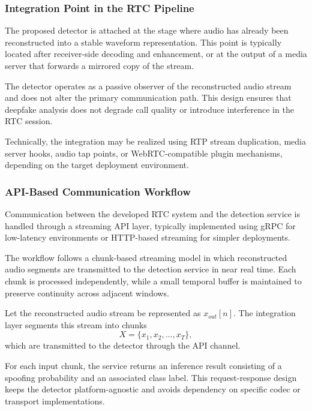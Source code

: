 \subsubsection{Integration Point in the RTC Pipeline}

The proposed detector is attached at the stage where audio has already been reconstructed into a stable waveform representation. This point is typically located after receiver-side decoding and enhancement, or at the output of a media server that forwards a mirrored copy of the stream.

The detector operates as a passive observer of the reconstructed audio stream and does not alter the primary communication path. This design ensures that deepfake analysis does not degrade call quality or introduce interference in the RTC session.

Technically, the integration may be realized using RTP stream duplication, media server hooks, audio tap points, or WebRTC-compatible plugin mechanisms, depending on the target deployment environment.

\subsubsection{API-Based Communication Workflow}

Communication between the developed RTC system and the detection service is handled through a streaming API layer, typically implemented using gRPC for low-latency environments or HTTP-based streaming for simpler deployments.

The workflow follows a chunk-based streaming model in which reconstructed audio segments are transmitted to the detection service in near real time. Each chunk is processed independently, while a small temporal buffer is maintained to preserve continuity across adjacent windows.

Let the reconstructed audio stream be represented as \(x_{out}[n]\). The integration layer segments this stream into chunks
\begin{equation}
X = \{x_1, x_2, \ldots, x_T\},
\end{equation}
which are transmitted to the detector through the API channel.

For each input chunk, the service returns an inference result consisting of a spoofing probability and an associated class label. This request-response design keeps the detector platform-agnostic and avoids dependency on specific codec or transport implementations.

